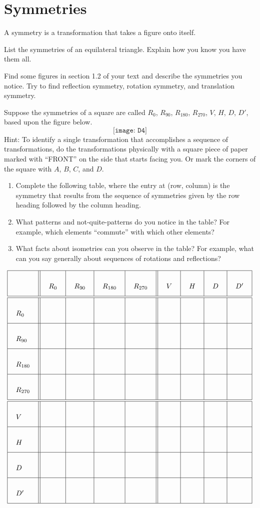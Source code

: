 \newpage

\section{Symmetries}
\begin{definition}
A symmetry is a transformation that takes a figure onto itself.  
\end{definition}
\begin{prob}
List the symmetries of an equilateral triangle.  Explain how you know you have them all.  
\end{prob}


\begin{prob}
Find some figures in section 1.2 of your text and describe the symmetries you notice.  Try to find reflection symmetry, rotation symmetry, and translation symmetry.  
\end{prob}

\begin{prob}
Suppose the symmetries of a square are called $R_0$, $R_{90}$, $R_{180}$, $R_{270}$, $V$, $H$, $D$, $D'$, based upon the figure below.  
$$\texttt{[image: D4]}$$
Hint:  To identify a single transformation that accomplishes a sequence of transformations, do the transformations physically with a square piece of paper marked with ``FRONT'' on the side that starts facing you.  Or mark the corners of the square with $A$, $B$, $C$, and $D$.  
\begin{enumerate}
\item Complete the following table, where the entry at (row, column) is the symmetry that results from the sequence of symmetries given by the row heading followed by the column heading.  
\item What patterns and not-quite-patterns do you notice in the table?  For example, which elements ``commute'' with which other elements?
\item What facts about isometries can you observe in the table?  For example, what can you say generally about sequences of rotations and reflections?  
\end{enumerate}

{\[\arraycolsep=12pt\def\arraystretch{3}
\begin{array}{|l||l|l|l|l||l|l|l|l|}
\hline
 & R_0 & R_{90} & R_{180} & R_{270} & V & H & D & D' \\ \hline\hline
R_0 & & & & & & & & \\ \hline
R_{90} & & & & & & & & \\ \hline
R_{180} & & & & & & & & \\ \hline
R_{270} & & & & & & & & \\ \hline\hline
V & & & & & & & & \\ \hline
H & & & & & & & & \\ \hline
D & & & & & & & & \\ \hline
D' & & & & & & & & \\ \hline
\end{array}
\]}
\end{prob}



